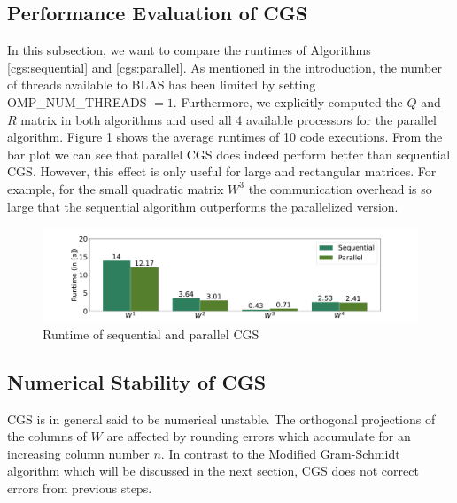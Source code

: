 \documentclass{article}
\begin{document}
\subsection{Performance Evaluation of CGS}

In this subsection, we want to compare the runtimes of Algorithms
\ref{cgs:sequential} and \ref{cgs:parallel}. As mentioned in the introduction,
the number of threads available to BLAS has been limited by setting
OMP\_NUM\_THREADS $= 1$. Furthermore, we explicitly computed the $Q$ and $R$
matrix in both algorithms and used all 4 available processors for the parallel
algorithm. Figure \ref{fig:performanceCGS} shows the average runtimes of 10 code
executions. From the bar plot we can see that parallel CGS does indeed perform
better than sequential CGS. However, this effect is only useful for large and
rectangular matrices. For example, for the small quadratic matrix $W^3$ the
communication overhead is so large that the sequential algorithm outperforms the
parallelized version.

\begin{figure}[t]
    \caption{Runtime of sequential and parallel CGS} \label{fig:performanceCGS}
    \centering
    \includegraphics[width=\textwidth, trim = 0cm 1.5cm 0cm 1cm]{./plots/CGS_Performance.pdf}
\end{figure}

\subsection{Numerical Stability of CGS} \label{section:cgsStability}

CGS is in general said to be numerical unstable. The orthogonal projections of
the columns of $W$ are affected by rounding errors which accumulate for an
increasing column number $n$. In contrast to the Modified Gram-Schmidt algorithm
which will be discussed in the next section, CGS does not correct errors from
previous steps.
\end{document}
